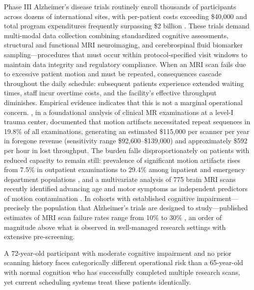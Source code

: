 \documentclass[11pt,a4paper]{article}
\begin{document}
Phase III Alzheimer's disease trials routinely enroll thousands of participants across dozens of international sites, with per-patient costs exceeding \$40,000 and total program expenditures frequently surpassing \$2 billion \citep{cummings2014clinical}. These trials demand multi-modal data collection combining standardized cognitive assessments, structural and functional MRI neuroimaging, and cerebrospinal fluid biomarker sampling---procedures that must occur within protocol-specified visit windows to maintain data integrity and regulatory compliance. When an MRI scan fails due to excessive patient motion and must be repeated, consequences cascade throughout the daily schedule: subsequent patients experience extended waiting times, staff incur overtime costs, and the facility's effective throughput diminishes. Empirical evidence indicates that this is not a marginal operational concern. \citet{andre2015quantifying}, in a foundational analysis of clinical MR examinations at a level-I trauma center, documented that motion artifacts necessitated repeat sequences in 19.8\% of all examinations, generating an estimated \$115{,}000 per scanner per year in foregone revenue (sensitivity range \$92{,}600--\$139{,}000) and approximately \$592 per hour in lost throughput. The burden falls disproportionately on patients with reduced capacity to remain still: prevalence of significant motion artifacts rises from 7.5\% in outpatient examinations to 29.4\% among inpatient and emergency department populations \citep{andre2015quantifying}, and a multivariate analysis of 775 brain MRI scans recently identified advancing age and motor symptoms as independent predictors of motion contamination \citep{krag2025motion}. In cohorts with established cognitive impairment---precisely the population that Alzheimer's trials are designed to study---published estimates of MRI scan failure rates range from 10\% to 30\% \citep{porembka2025disparities}, an order of magnitude above what is observed in well-managed research settings with extensive pre-screening.

A 72-year-old participant with moderate cognitive impairment and no prior scanning history faces categorically different operational risk than a 65-year-old with normal cognition who has successfully completed multiple research scans, yet current scheduling systems treat these patients identically.
\end{document}
